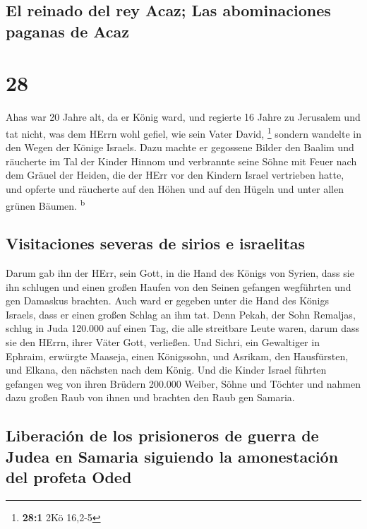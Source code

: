 \hypertarget{el-reinado-del-rey-acaz-las-abominaciones-paganas-de-acaz}{%
\subsection{El reinado del rey Acaz; Las abominaciones paganas de
Acaz}\label{el-reinado-del-rey-acaz-las-abominaciones-paganas-de-acaz}}

\hypertarget{section-27}{%
\section{28}\label{section-27}}

 Ahas war 20 Jahre alt, da er König ward, und regierte 16
Jahre zu Jerusalem und tat nicht, was dem HErrn wohl gefiel, wie sein
Vater David, \footnote{\textbf{28:1} 2Kö 16,2-5}  sondern
wandelte in den Wegen der Könige Israels. Dazu machte er gegossene
Bilder den Baalim  und räucherte im Tal der Kinder Hinnom
und verbrannte seine Söhne mit Feuer nach dem Gräuel der Heiden, die der
HErr vor den Kindern Israel vertrieben hatte,  und opferte
und räucherte auf den Höhen und auf den Hügeln und unter allen grünen
Bäumen. \textsuperscript{b}

\hypertarget{visitaciones-severas-de-sirios-e-israelitas}{%
\subsection{Visitaciones severas de sirios e
israelitas}\label{visitaciones-severas-de-sirios-e-israelitas}}

 Darum gab ihn der HErr, sein Gott, in die Hand des Königs
von Syrien, dass sie ihn schlugen und einen großen Haufen von den Seinen
gefangen wegführten und gen Damaskus brachten. Auch ward er gegeben
unter die Hand des Königs Israels, dass er einen großen Schlag an ihm
tat.  Denn Pekah, der Sohn Remaljas, schlug in Juda
120.000 auf einen Tag, die alle streitbare Leute waren, darum dass sie
den HErrn, ihrer Väter Gott, verließen.  Und Sichri, ein
Gewaltiger in Ephraim, erwürgte Maaseja, einen Königssohn, und Asrikam,
den Hausfürsten, und Elkana, den nächsten nach dem König. 
Und die Kinder Israel führten gefangen weg von ihren Brüdern 200.000
Weiber, Söhne und Töchter und nahmen dazu großen Raub von ihnen und
brachten den Raub gen Samaria.

\hypertarget{liberaciuxf3n-de-los-prisioneros-de-guerra-de-judea-en-samaria-siguiendo-la-amonestaciuxf3n-del-profeta-oded}{%
\subsection{Liberación de los prisioneros de guerra de Judea en Samaria
siguiendo la amonestación del profeta
Oded}\label{liberaciuxf3n-de-los-prisioneros-de-guerra-de-judea-en-samaria-siguiendo-la-amonestaciuxf3n-del-profeta-oded}}

